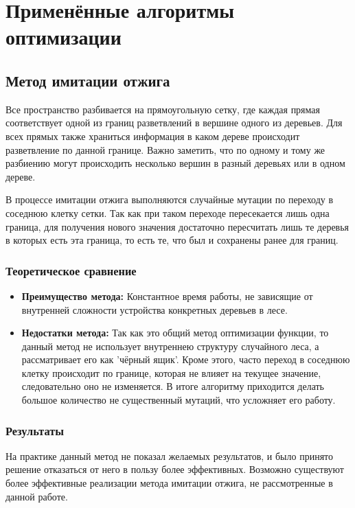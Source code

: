 \chapter{Применённые алгоритмы оптимизации}

\section{Метод имитации отжига}

Все пространство разбивается на прямоугольную сетку, где каждая прямая
соответствует одной из границ разветвлений в вершине одного из деревьев. Для
всех прямых также храниться информация в каком дереве происходит разветвление по
данной границе. Важно заметить, что по одному и тому же разбиению могут
происходить несколько вершин в разный деревьях или в одном дереве.

В процессе имитации отжига выполняются случайные мутации по переходу в соседнюю клетку сетки.
Так как при таком переходе пересекается лишь одна граница, для получения нового
значения достаточно пересчитать лишь те деревья в которых есть эта граница, то
есть те, что был и сохранены ранее для границ.

\subsection{Теоретическое сравнение}

\begin{itemize}
    \item \textbf{Преимущество метода:} Константное время работы, не
    зависящие от внутренней сложности устройства конкретных деревьев в лесе.
    \item \textbf{Недостатки метода:} Так как это общий метод оптимизации функции, то
    данный метод не использует внутреннею структуру случайного леса,
    а рассматривает его как 'чёрный ящик'. Кроме этого, часто переход в соседнюю
    клетку происходит по границе, которая не влияет на текущее значение,
    следовательно оно не изменяется. В итоге алгоритму приходится делать большое
    количество не существенный мутаций, что усложняет его работу.
\end{itemize}

\subsection{Результаты}
На практике данный метод не показал желаемых результатов, и было принято решение
отказаться от него в пользу более эффективных. Возможно существуют более эффективные
реализации метода имитации отжига, не рассмотренные в данной работе.


